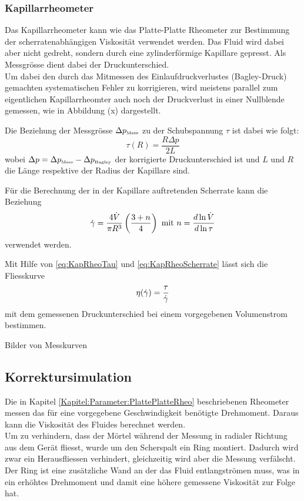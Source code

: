 \subsubsection{Kapillarrheometer}
Das Kapillarrheometer kann wie das Platte-Platte Rheometer zur Bestimmung der scherratenabhängigen Viskosität verwendet werden. Das Fluid wird dabei aber nicht gedreht, sondern durch eine zylinderförmige Kapillare gepresst. Als Messgrösse dient dabei der Druckunterschied.\\
Um dabei den durch das Mitmessen des Einlaufdruckverlustes (Bagley-Druck) gemachten systematischen Fehler zu korrigieren, wird meistens parallel zum eigentlichen Kapillarrheomter auch noch der Druckverlust in einer Nullblende gemessen, wie in Abbildung (x) dargestellt. 

Die Beziehung der Messgrösse $\Delta p_{\mbox{\tiny Mess}}$ zu der Schubspannung $\tau$ ist dabei wie folgt:
\begin{equation}
    \label{eq:KapRheoTau}
    \tau\left( R \right) = \frac{R \Delta p}{2L}
\end{equation}
wobei $\Delta p = \Delta p_{\mbox{\tiny Mess}} -\Delta p_{\mbox{\tiny Bagley}}$ der korrigierte Druckunterschied ist und $L$ und $R$ die Länge respektive der Radius der Kapillare sind.

Für die Berechnung der in der Kapillare auftretenden Scherrate kann die Beziehung
\begin{equation}
    \label{eq:KapRheoScherrate}
    \dot\gamma = \frac{4 \dot{V}}{\pi R^3}\left( \frac{3+n}{4} \right) \mbox{ mit } n=\frac{d \ln \dot{V}}{d\ln\tau}
\end{equation}
verwendet werden.

Mit Hilfe von \eqref{eq:KapRheoTau} und \eqref{eq:KapRheoScherrate} lässt sich die Fliesskurve 
\begin{equation}
    \eta(\dot\gamma) = \frac{\tau}{\dot\gamma}
\end{equation}
mit dem gemessenen Druckunterschied bei einem vorgegebenen Volumenstrom bestimmen.
%
\begin{todocontent}
    \1 Bilder von Messkurven
\end{todocontent}
%
\subsection{Korrektursimulation}
\label{Kapitel:Korrektursimulation}
Die in Kapitel \ref{Kapitel:Parameter:PlattePlatteRheo} beschriebenen Rheometer messen das für eine vorgegebene Geschwindigkeit benötigte Drehmoment. Daraus kann die Viskosität des Fluides berechnet werden.\\
Um zu verhindern, dass der Mörtel während der Messung in radialer Richtung aus dem Gerät fliesst, wurde um den Scherspalt ein Ring montiert. Dadurch wird zwar ein Herausfliessen verhindert, gleichzeitig wird aber die Messung verfälscht. Der Ring ist eine zusätzliche Wand an der das Fluid entlangströmen muss, was in ein erhöhtes Drehmoment und damit eine höhere gemessene Viskosität zur Folge hat.

